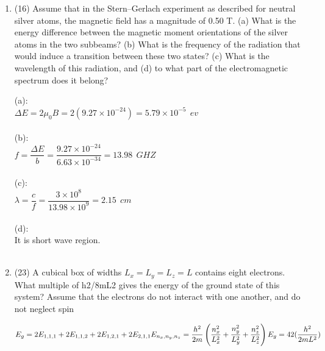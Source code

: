 \documentclass[fleqn]{article}
\begin{document}
\begin{enumerate}
    
    \item (16) Assume that in the Stern–Gerlach experiment as described for
    neutral silver atoms, the magnetic field has a magnitude of 0.50 T.
    (a) What is the energy difference between the magnetic moment orientations of the silver atoms in the two subbeams? (b) What is the
    frequency of the radiation that would induce a transition between
    these two states? (c) What is the wavelength of this radiation, and (d)
    to what part of the electromagnetic spectrum does it belong?

      \textcolor{hwColor}{
        (a): \\
        $
          \Delta E=2\mu_0 B=2(9.27 \times 10^{-24})=5.79 \times 10^{-5} ~~ ev
        $
        \\
        \\
        (b): \\
        $f=\dfrac{\Delta E}{b}=\dfrac{9.27 \times 10^{-24}}{6.63 \times 10^{-34}}=13.98 ~~ GHZ$
        \\
        \\
        (c): \\
        $
          \lambda=\dfrac{c}{f}=\dfrac{3 \times 10^{8}}{13.98 \times 10^9}=2.15 ~~ cm
        $
        \\
        \\
        (d): \\
        It is short wave region.
        \\
        \\
      }
    
    
    \item (23) A cubical box of widths $L_x=L_y=L_z=L$ contains eight electrons. What multiple of h2/8mL2 gives the energy of the ground state of this system? Assume that the electrons do not interact with one another, and do not neglect spin


      \textcolor{hwColor}{
        $
          E_g=2E_{1,1,1}+2E_{1,1,2}+2E_{1,2,1}+2E_{2,1,1} \\
          E_{n_x,n_y,n_z}=\dfrac{h^2}{2m}\left(\dfrac{n^2_x}{L^2_x}+\dfrac{n^2_y}{L^2_y}+\dfrac{n^2_z}{L^2_z}\right) \\
          E_g=42(\dfrac{h^2}{2mL^2})
        $ 
      }
    
  \end{enumerate}
\end{document}
